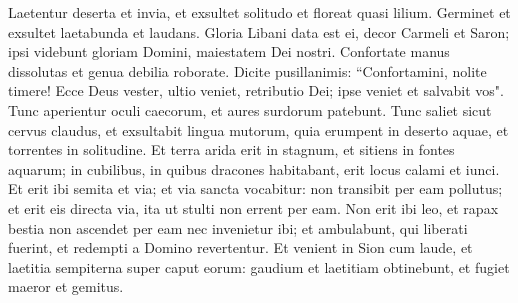 \begin{biblechapter}  
\verse Laetentur deserta et invia, et exsultet solitudo et floreat quasi lilium. 
\verse Germinet et exsultet laetabunda et laudans. Gloria Libani data est ei, decor Carmeli et Saron; ipsi videbunt gloriam Domini, maiestatem Dei nostri. 
\verse Confortate manus dissolutas et genua debilia roborate. 
\verse Dicite pusillanimis: “Confortamini, nolite timere! Ecce Deus vester, ultio veniet, retributio Dei; ipse veniet et salvabit vos". 
\verse Tunc aperientur oculi caecorum, et aures surdorum patebunt. 
\verse Tunc saliet sicut cervus claudus, et exsultabit lingua mutorum, quia erumpent in deserto aquae, et torrentes in solitudine. 
\verse Et terra arida erit in stagnum, et sitiens in fontes aquarum; in cubilibus, in quibus dracones habitabant, erit locus calami et iunci. 
\verse Et erit ibi semita et via; et via sancta vocabitur: non transibit per eam pollutus; et erit eis directa via, ita ut stulti non errent per eam. 
\verse Non erit ibi leo, et rapax bestia non ascendet per eam nec invenietur ibi; et ambulabunt, qui liberati fuerint, 
\verse et redempti a Domino revertentur. Et venient in Sion cum laude, et laetitia sempiterna super caput eorum: gaudium et laetitiam obtinebunt, et fugiet maeror et gemitus. 
\end{biblechapter}

